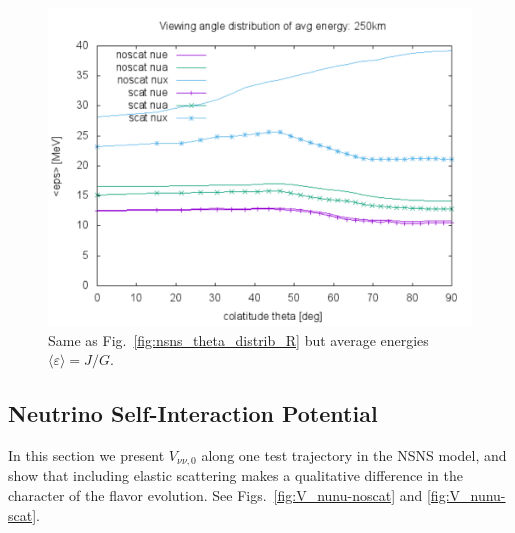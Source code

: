 \documentclass[aps,floatfix,prd,superscriptaddress,twocolumn]{revtex4-1}
\begin{document}
\begin{figure}
  \includegraphics[width=\columnwidth]{theta_distrib-250km-avg_eps}
  \caption{Same as Fig.~\ref{fig:nsns_theta_distrib_R} but
    average energies $\langle \varepsilon \rangle = J/G$.}
  \label{fig:nsns_theta_distrib_avg_eps}
\end{figure}

\subsection{Neutrino Self-Interaction Potential}
\label{ssec:V_nunu}
In this section we present $V_{\nu\nu,0}$ along one test trajectory in the NSNS
model, and show that including elastic scattering makes a qualitative
difference in the character of the flavor evolution.
See Figs.~\ref{fig:V_nunu-noscat} and \ref{fig:V_nunu-scat}.
\end{document}
